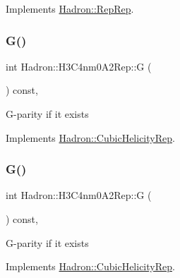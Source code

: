 Implements \mbox{\hyperlink{structHadron_1_1RepRep_a92c8802e5ed7afd7da43ccfd5b7cd92b}{Hadron\+::\+Rep\+Rep}}.

\mbox{\label{structHadron_1_1H3C4nm0A2Rep_a66c078d78251649317b94fa865face29}} 
\subsubsection{\texorpdfstring{G()}{G()}\hspace{0.1cm}{\footnotesize\ttfamily [1/3]}}
{\footnotesize\ttfamily int Hadron\+::\+H3\+C4nm0\+A2\+Rep\+::G (\begin{DoxyParamCaption}{ }\end{DoxyParamCaption}) const\hspace{0.3cm}{\ttfamily [inline]}, {\ttfamily [virtual]}}

G-\/parity if it exists 

Implements \mbox{\hyperlink{structHadron_1_1CubicHelicityRep_a50689f42be1e6170aa8cf6ad0597018b}{Hadron\+::\+Cubic\+Helicity\+Rep}}.

\mbox{\label{structHadron_1_1H3C4nm0A2Rep_a66c078d78251649317b94fa865face29}} 
\subsubsection{\texorpdfstring{G()}{G()}\hspace{0.1cm}{\footnotesize\ttfamily [2/3]}}
{\footnotesize\ttfamily int Hadron\+::\+H3\+C4nm0\+A2\+Rep\+::G (\begin{DoxyParamCaption}{ }\end{DoxyParamCaption}) const\hspace{0.3cm}{\ttfamily [inline]}, {\ttfamily [virtual]}}

G-\/parity if it exists 

Implements \mbox{\hyperlink{structHadron_1_1CubicHelicityRep_a50689f42be1e6170aa8cf6ad0597018b}{Hadron\+::\+Cubic\+Helicity\+Rep}}.

\mbox{\label{structHadron_1_1H3C4nm0A2Rep_a66c078d78251649317b94fa865face29}} 
